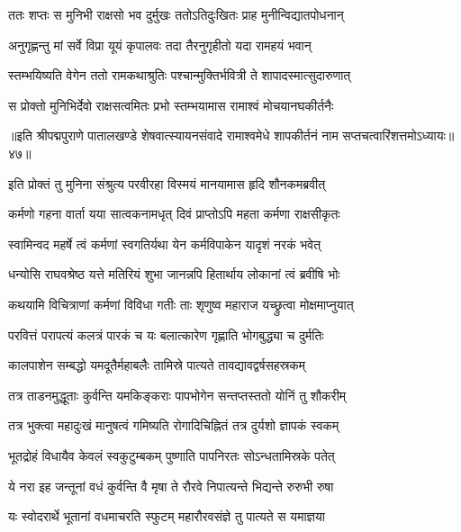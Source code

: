\twolineshloka
{ततः शप्तः स मुनिभी राक्षसो भव दुर्मुखः}
{ततोऽतिदुःखितः प्राह मुनीन्विद्यातपोधनान्}%

\twolineshloka
{अनुगृह्णन्तु मां सर्वे विप्रा यूयं कृपालवः}
{तदा तैरनुगृहीतो यदा रामहयं भवान्}%

\twolineshloka
{स्तम्भयिष्यति वेगेन ततो रामकथाश्रुतिः}
{पश्चान्मुक्तिर्भवित्री ते शापादस्मात्सुदारुणात्}%

\twolineshloka
{स प्रोक्तो मुनिभिर्देवो राक्षसत्वमितः प्रभो}
{स्तम्भयामास रामाश्वं मोचयानघकीर्तनैः}%

{॥इति श्रीपद्मपुराणे पातालखण्डे शेषवात्स्यायनसंवादे रामाश्वमेधे शापकीर्तनं नाम सप्तचत्वारिंशत्तमोऽध्यायः॥४७॥}



\twolineshloka
{इति प्रोक्तं तु मुनिना संश्रुत्य परवीरहा}
{विस्मयं मानयामास हृदि शौनकमब्रवीत्}%


\twolineshloka
{कर्मणो गहना वार्ता यया सात्वकनामधृत्}
{दिवं प्राप्तोऽपि महता कर्मणा राक्षसीकृतः}%

\twolineshloka
{स्वामिन्वद महर्षे त्वं कर्मणां स्वगतिर्यथा}
{येन कर्मविपाकेन यादृशं नरकं भवेत्}%


\twolineshloka
{धन्योसि राघवश्रेष्ठ यत्ते मतिरियं शुभा}
{जानन्नपि हितार्थाय लोकानां त्वं ब्रवीषि भोः}%

\twolineshloka
{कथयामि विचित्राणां कर्मणां विविधा गतीः}
{ताः शृणुष्व महाराज यच्छ्रुत्वा मोक्षमाप्नुयात्}%

\twolineshloka
{परवित्तं परापत्यं कलत्रं पारकं च यः}
{बलात्कारेण गृह्णाति भोगबुद्ध्या च दुर्मतिः}%

\twolineshloka
{कालपाशेन सम्बद्धो यमदूतैर्महाबलैः}
{तामिस्रे पात्यते तावद्यावद्वर्षसहस्रकम्}%

\twolineshloka
{तत्र ताडनमुद्धूताः कुर्वन्ति यमकिङ्कराः}
{पापभोगेन सन्तप्तस्ततो योनिं तु शौकरीम्}%

\twolineshloka
{तत्र भुक्त्वा महादुःखं मानुषत्वं गमिष्यति}
{रोगादिचिह्नितं तत्र दुर्यशो ज्ञापकं स्वकम्}%

\twolineshloka
{भूतद्रोहं विधायैव केवलं स्वकुटुम्बकम्}
{पुष्णाति पापनिरतः सोऽन्धतामिस्रके पतेत्}%

\twolineshloka
{ये नरा इह जन्तूनां वधं कुर्वन्ति वै मृषा}
{ते रौरवे निपात्यन्ते भिद्यन्ते रुरुभी रुषा}%

\twolineshloka
{यः स्वोदरार्थे भूतानां वधमाचरति स्फुटम्}
{महारौरवसंज्ञे तु पात्यते स यमाज्ञया}%

